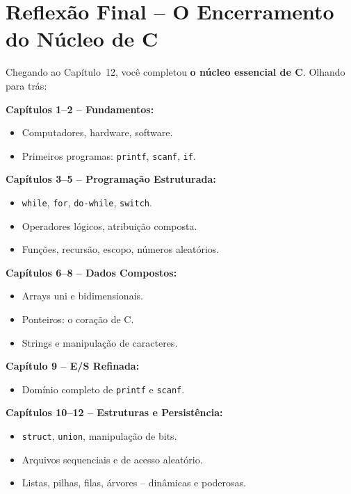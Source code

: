 \documentclass[12pt,a4paper]{article}
\begin{document}
\bigskip

\section*{Reflexão Final -- O Encerramento do Núcleo de C}

\begin{tcolorbox}[colback=deitellightblue,colframe=deitelblue,
  title={\bfseries 12 capítulos, uma jornada completa}]

Chegando ao Capítulo~12, você completou \textbf{o núcleo essencial de C}.
Olhando para trás:

\textbf{Capítulos 1--2 -- Fundamentos:}
\begin{itemize}[noitemsep]
  \item Computadores, hardware, software.
  \item Primeiros programas: \texttt{printf}, \texttt{scanf}, \texttt{if}.
\end{itemize}

\textbf{Capítulos 3--5 -- Programação Estruturada:}
\begin{itemize}[noitemsep]
  \item \texttt{while}, \texttt{for}, \texttt{do-while}, \texttt{switch}.
  \item Operadores lógicos, atribuição composta.
  \item Funções, recursão, escopo, números aleatórios.
\end{itemize}

\textbf{Capítulos 6--8 -- Dados Compostos:}
\begin{itemize}[noitemsep]
  \item Arrays uni e bidimensionais.
  \item Ponteiros: o coração de C.
  \item Strings e manipulação de caracteres.
\end{itemize}

\textbf{Capítulo 9 -- E/S Refinada:}
\begin{itemize}[noitemsep]
  \item Domínio completo de \texttt{printf} e \texttt{scanf}.
\end{itemize}

\textbf{Capítulos 10--12 -- Estruturas e Persistência:}
\begin{itemize}[noitemsep]
  \item \texttt{struct}, \texttt{union}, manipulação de bits.
  \item Arquivos sequenciais e de acesso aleatório.
  \item Listas, pilhas, filas, árvores -- dinâmicas e poderosas.
\end{itemize}


\end{tcolorbox}
\end{document}
